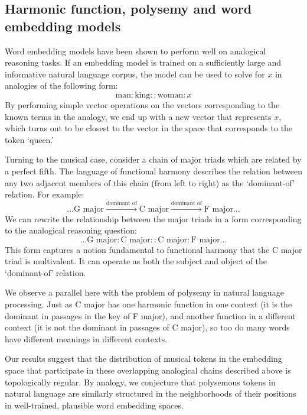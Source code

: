 \subsection{Harmonic function, polysemy and word embedding models}
Word embedding models have been shown to perform well on analogical reasoning tasks. If an embedding model is trained on a sufficiently large and informative natural language corpus, the model can be used to solve for $x$ in analogies of the following form:
$$\textrm{man}:\textrm{king}::\textrm{woman}:x$$
By performing simple vector operations on the vectors corresponding to the known terms in the analogy, we end up with a new vector that represents $x$, which turns out to be closest to the vector in the space that corresponds to the token `$\textrm{queen}$.' 

Turning to the musical case, consider a chain of major triads which are related by a perfect fifth. The language of functional harmony describes the relation between any two adjacent members of this chain (from left to right) as the `dominant-of' relation. For example:
$$\hdots \textrm{G major} \xrightarrow{\textrm{dominant of}} \textrm{C major} \xrightarrow{\textrm{dominant of}} \textrm{F major} \hdots$$
We can rewrite the relationship between the major triads in a form corresponding to the analogical reasoning question:
$$\hdots \textrm{G major} : \textrm{C major}  :: \textrm{C major} : \textrm{F major} \hdots$$
This form captures a notion fundamental to functional harmony that the C major triad is multivalent. It can operate as both the subject and object of the `dominant-of' relation. 

We observe a parallel here with the problem of polysemy in natural language processing. Just as C major has one harmonic function in one context (it is the dominant in passages in the key of F major), and another function in a different context (it is not the dominant in passages of C major), so too do many words have different meanings in different contexts.

Our results suggest that the distribution of musical tokens in the embedding space that participate in these overlapping analogical chains described above is topologically regular. By analogy, we conjecture that polysemous tokens in natural language are similarly structured in the neighborhoods of their positions in well-trained, plausible word embedding spaces.

